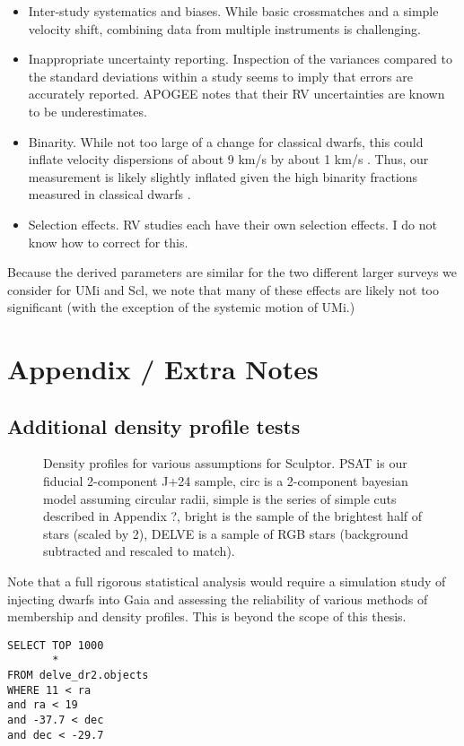 \begin{itemize}
\tightlist
\item
  Inter-study systematics and biases. While basic crossmatches and a
  simple velocity shift, combining data from multiple instruments is
  challenging.
\item
  Inappropriate uncertainty reporting. Inspection of the variances
  compared to the standard deviations within a study seems to imply that
  errors are accurately reported. APOGEE notes that their RV
  uncertainties are known to be underestimates.
\item
  Binarity. While not too large of a change for classical dwarfs, this
  could inflate velocity dispersions of about 9 km/s by about 1 km/s
  \citet{spencer+2017}. Thus, our measurement is likely slightly
  inflated given the high binarity fractions measured in classical
  dwarfs \citep[\citet{spencer+2018}]{arroyo-polonio+2023}.
\item
  Selection effects. RV studies each have their own selection effects. I
  do not know how to correct for this.
\end{itemize}

Because the derived parameters are similar for the two different larger
surveys we consider for UMi and Scl, we note that many of these effects
are likely not too significant (with the exception of the systemic
motion of UMi.)

\section{Appendix / Extra Notes}\label{appendix-extra-notes}

\subsection{Additional density profile
tests}\label{additional-density-profile-tests}

\begin{figure}
\centering
{}
\caption[Density profiles]{Density profiles for various assumptions for
Sculptor. PSAT is our fiducial 2-component J+24 sample, circ is a
2-component bayesian model assuming circular radii, simple is the series
of simple cuts described in Appendix ?, bright is the sample of the
brightest half of stars (scaled by 2), DELVE is a sample of RGB stars
(background subtracted and rescaled to
match).}\label{fig:sculptor_observed_profiles}
\end{figure}

Note that a full rigorous statistical analysis would require a
simulation study of injecting dwarfs into Gaia and assessing the
reliability of various methods of membership and density profiles. This
is beyond the scope of this thesis.

\begin{verbatim}
SELECT TOP 1000
       *
FROM delve_dr2.objects
WHERE 11 < ra
and ra < 19
and -37.7 < dec
and dec < -29.7
\end{verbatim}
